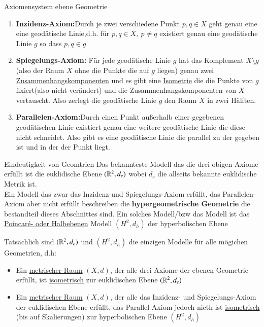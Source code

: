 \begin{titleDef}{Axiomensystem ebene Geometrie}
\label{axiomPlane}
\begin{enumerate}
	\item \begin{rawDef}\label{inzidenzAxiom}
		\textbf{Inzidenz-Axiom:}Durch je zwei verschiedene Punkt $p,q\in X$ geht genau eine eine geodätische Linie,d.h. für $p,q\in X,\:p\neq q$ existiert genau eine geodätische Linie $g$ so dass $p,q\in g$
	\end{rawDef}
	\item \begin{rawDef}\label{spiegelungsAxiom}
	\textbf{Spiegelungs-Axiom:} Für jede geodätische Linie $g$ hat das Komplement $X\setminus g$ (also der Raum $X$ ohne die Punkte die auf $g$ liegen) genau zwei \hyperref[zsmkomponente]{Zusammenhangskomponenten} und es gibt eine \hyperref[Isometrie]{Isometrie} die die Punkte von $g$ fixiert(also nicht verändert) und die Zusammenhangskomponenten von $X$ vertauscht. Also zerlegt die geodätische Linie $g$ den Raum $X$ in zwei Hälften.
\end{rawDef}
	\item \begin{rawDef}\label{parallelenAxiom}
	\textbf{Parallelen-Axiom:}Durch einen Punkt außerhalb einer gegebenen geodätischen Linie existiert genau eine weitere geodätische Linie die diese nicht schneidet. Also gibt es eine geodätische Linie die parallel zu der gegeben ist und in der der Punkt liegt.
\end{rawDef}
\end{enumerate}
\end{titleDef}

\begin{titleDef}{Eindeutigkeit von Geomtrien}
\label{eindeutigkeitGeo}
Das bekannteste Modell das die drei obigen Axiome erfüllt ist die euklidische Ebene $(\mathbb{R}^2,d_e)$ wobei $d_e$ die allseits bekannte euklidische Metrik ist.\\
Ein Modell das zwar das Inzidenz-und Spiegelungs-Axiom erfüllt, das Parallelen-Axiom aber nicht erfüllt beschreiben die \textbf{hypergeometrische Geometrie} die bestandteil dieses Abschnittes sind. Ein solches Modell/bzw das Modell ist das \hyperref[poincare]{Poincaré- oder Halbebenen} Modell $(H^2,d_h)$ der hyperbolischen Ebene\par
Tatsächlich sind $(\mathbb{R}^2,d_e)$ und $(H^2,d_h)$ die einzigen Modelle für alle mögichen Geometrien, d.h:
\begin{itemize}
	\item Ein \hyperref[MetrischerRaum]{metrischer Raum} $(X,d)$, der alle drei Axiome der ebenen Geometrie erfüllt, ist \hyperref[Isometrie]{isometrisch} zur euklidischen Ebene $(\mathbb{R}^2,d_e)$
	\item Ein \hyperref[MetrischerRaum]{metrischer Raum} $(X,d)$, der alle das Inzidenz- und Spiegelungs-Axiom der euklidischen Ebene erfüllt, das Parallel-Axiom jedoch nicth ist \hyperref[Isometrie]{isometrisch} (bis auf Skalierungen) zur hyperbolischen Ebene $(H^2,d_h)$
\end{itemize}
\end{titleDef}

